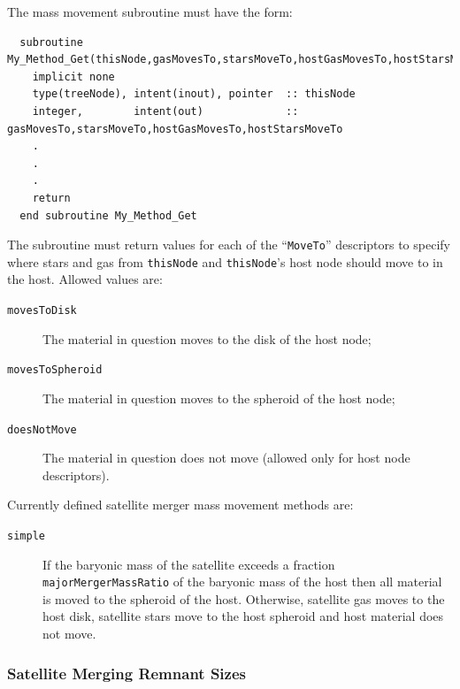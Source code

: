 The mass movement subroutine must have the form:
\begin{verbatim}
  subroutine My_Method_Get(thisNode,gasMovesTo,starsMoveTo,hostGasMovesTo,hostStarsMoveTo)
    implicit none
    type(treeNode), intent(inout), pointer  :: thisNode
    integer,        intent(out)             :: gasMovesTo,starsMoveTo,hostGasMovesTo,hostStarsMoveTo
    .
    .
    .
    return
  end subroutine My_Method_Get
\end{verbatim}
The subroutine must return values for each of the ``{\tt MoveTo}'' descriptors to specify where stars and gas from {\tt thisNode} and {\tt thisNode}'s host node should move to in the host. Allowed values are:
\begin{description}
 \item [{\tt movesToDisk}] The material in question moves to the disk of the host node;
 \item [{\tt movesToSpheroid}] The material in question moves to the spheroid of the host node;
 \item [{\tt doesNotMove}] The material in question does not move (allowed only for host node descriptors).
\end{description}

Currently defined satellite merger mass movement methods are:
\begin{description}
 \item [{\tt simple}] If the baryonic mass of the satellite exceeds a fraction {\tt majorMergerMassRatio} of the baryonic mass of the host then all material is moved to the spheroid of the host. Otherwise, satellite gas moves to the host disk, satellite stars move to the host spheroid and host material does not move.
\end{description}

\subsubsection{Satellite Merging Remnant Sizes}\label{sec:satelliteMergerMassMovementMethod}

